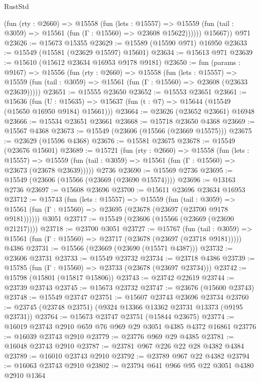 \begin{lexlean}{RustStd}
\begin{coremodule}
            (fun (rty : @2660) =>
            @15558
              (fun (lets : @15557) =>
              @15559 (fun (tail : @3059) => @15561 (fun (Γ : @15560) => @23608 @15622))))))
        @15667))
    @971
@23626 := @15673 @15355
@23629 := @15589 (@15590 @971) @16950
@23633 := @15549 (@15581 (@23629 @15597) @15601)
@23634 := @15613 @971
@23639 := @15610 (@15612 @23634 @16953 @9178 @9181)
@23650 := fun (params : @9167) =>
  @15556
    (fun (rty : @2660) =>
    @15558
      (fun (lets : @15557) =>
      @15559 (fun (tail : @3059) => @15561 (fun (Γ : @15560) => @23608 (@23633 @23639)))))
@23651 := @15555 @23650
@23652 := @15553 @23651
@23661 := @15636
    (fun (U : @15635) => @15637 (fun (t : @7) => @15644 (@15549 (@15650 @16950 @9184) @15661)))
@23664 := @23626 (@23652 @23661) @16948
@23666 := @15534 @23651 @23661
@23668 := @15718 @23650 @4368
@23669 := @15567 @4368
@23673 := @15549 (@23606 (@15566 (@23669 @15575)))
@23675 := @23629 (@15596 @4368)
@23676 := @15581 @23675
@23678 := @15549 (@23676 @15601)
@23689 := @15721
    (fun (rty : @2660) =>
    @15558
      (fun (lets : @15557) =>
      @15559 (fun (tail : @3059) => @15561 (fun (Γ : @15560) => @23673 (@23678 @23639)))))
    @2736
@23690 := @15569 @2736
@23695 := @15549 (@23606 (@15566 (@23669 (@23690 @15574))))
@23696 := @13163 @2736
@23697 := @15608 @23696
@23700 := @15611 @23696 @23634 @16953
@23712 := @15743
    (fun (lets : @15557) =>
    @15559
      (fun (tail : @3059) =>
      @15561 (fun (Γ : @15560) => @23695 (@23678 (@23697 (@23700 @9178 @9181))))))
    @3051
@23717 := @15549 (@23606 (@15566 (@23669 (@23690 @21217))))
@23718 := @23700 @3051
@23727 := @15767
    (fun (tail : @3059) => @15561 (fun (Γ : @15560) => @23717 (@23678 (@23697 (@23718 @9181)))))
    @4386
@23731 := @15566 (@23669 (@23690 (@15571 @4387)))
@23732 := @23606 @23731
@23733 := @15549 @23732
@23734 := @23718 @4386
@23739 := @15785 (fun (Γ : @15560) => @23733 (@23678 (@23697 @23734)))
@23742 := @15798 (@15801 (@15817 @15806))
@23743 := @23742 @22619
@23744 := @23739 @23743
@23745 := @15673 @23732
@23747 := @23676 (@15600 @23743)
@23748 := @15549 @23747
@23751 := @15607 @23743 @23696 @23734
@23760 := @23745 (@23748 @23751) (@9324 @13366 @13362 @23731 @13373 (@9195 @23731))
@23764 := @15673 @23747 @23751 (@15844 @23675)
@23774 := @16019 @23743 @2910 @659 @76 @969 @29 @3051 @4385 @4372 @16861
@23776 := @16039 @23743 @2910
@23779 := @23776 @969 @29 @4385
@23781 := @16048 @23743 @2910
@23787 := @23781 @967 @226 @22 @28 @4382 @4384
@23789 := @16010 @23743 @2910
@23792 := @23789 @967 @22 @4382
@23794 := @16063 @23743 @2910
@23802 := @23794 @641 @966 @95 @22 @3051 @4380 @2910 @1364

\end{coremodule}
\end{lexlean}

